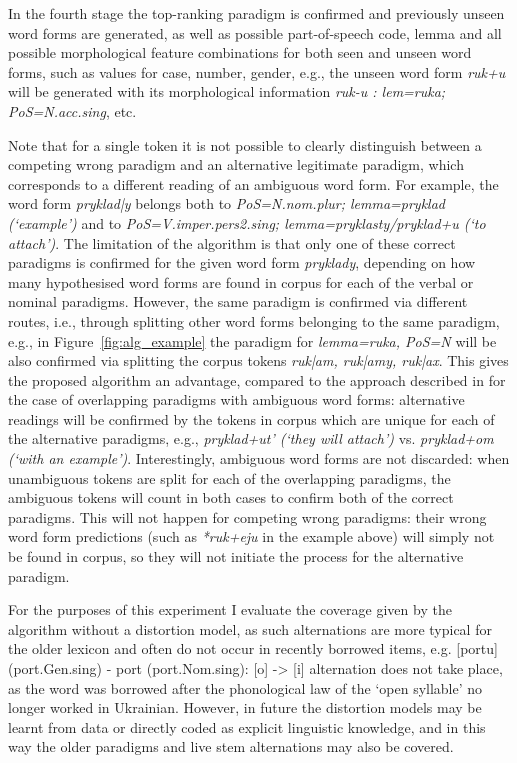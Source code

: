 \documentclass[11pt,a4paper]{article}
\begin{document}
In the fourth stage the top-ranking paradigm is confirmed and previously unseen word forms are generated, as well as possible part-of-speech code, lemma and all possible morphological feature combinations for both seen and unseen word forms, such as values for case, number, gender, e.g., the unseen word form \emph{ruk+u} will be generated with its morphological information \emph{ruk-u : lem=ruka; PoS=N.acc.sing}, etc.

Note that for a single token it is not possible to clearly distinguish between a competing wrong paradigm and an alternative legitimate paradigm, which corresponds to a different reading of an ambiguous word form. For example, the word form \emph{pryklad|y} belongs both to \emph{PoS=N.nom.plur; lemma=pryklad (`example')} and to \emph{PoS=V.imper.pers2.sing; lemma=pryklasty/pryklad+u (`to attach')}. The limitation of the algorithm is that only one of these correct paradigms is confirmed for the given word form \emph{pryklady}, depending on how many hypothesised word forms are found in corpus for each of the verbal or nominal paradigms. However, the same paradigm is confirmed via different routes, i.e., through splitting other word forms belonging to the same paradigm, e.g., in Figure~\ref{fig:alg_example} the paradigm for \emph{lemma=ruka, PoS=N} will be also confirmed via splitting the corpus tokens \emph{ruk|am, ruk|amy, ruk|ax}. This gives the proposed algorithm an advantage, compared to the approach described in \cite{ahlberg2015paradigm} for the case of overlapping paradigms with ambiguous word forms: alternative readings will be confirmed by the tokens in corpus which are unique for each of the alternative paradigms, e.g., \emph{pryklad+ut' (`they will attach')} vs. \emph{pryklad+om (`with an example')}. Interestingly, ambiguous word forms are not discarded: when unambiguous tokens are split for each of the overlapping paradigms, the ambiguous tokens will count in both cases to confirm both of the correct paradigms. This will not happen for competing wrong paradigms: their wrong word form predictions (such as \emph{*ruk+eju} in the example above)  will simply not be found in corpus, so they will not initiate the process for the alternative paradigm.

For the purposes of this experiment I evaluate the coverage given by the algorithm without a distortion model, as such alternations are more typical for the older lexicon and often do not occur in recently borrowed items, e.g. [portu] (port.Gen.sing) - port (port.Nom.sing): [o] -> [i] alternation does not take place, as the word was borrowed after the phonological law of the `open syllable' no longer worked in Ukrainian. However, in future the distortion models may be learnt from data or directly coded as explicit linguistic knowledge, and in this way the older paradigms and live stem alternations may also be covered. 
\end{document}
